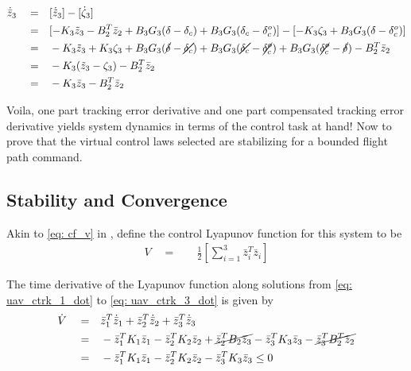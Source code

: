 \documentclass[12pt]{ucthesis}
\begin{document}
\begin{fleqn} 
\begin{align} \label{eq: uav_ctrk_3_dot}
\dot{\bar{z}}_3 \quad =& \quad [\dot{\tilde{z}}_3] - [\dot{\zeta}_3] \nonumber \\
				\quad =& \quad [-K_3 \tilde{z}_3 - B^T_2 \bar{z}_2 + B_3 G_3 (\delta - \delta_c) + B_3 G_3 (\delta_c - \delta^o_c)] - [-K_3 \zeta_3 + B_3 G_3(\delta - \delta^o_{c})] \nonumber \\
				\quad =& \quad -K_3 \tilde{z}_3 + K_3 \zeta_3 + B_3 G_3 (\cancel{\delta} - \cancel{\delta_c}) + B_3 G_3 (\cancel{\delta_c} - \cancel{\delta^o_c}) + B_3 G_3(\cancel{\delta^o_{c}} - \cancel{\delta}) -B^T_2 \bar{z}_2 \nonumber \\
				\quad =& \quad -K_3 (\tilde{z}_3 - \zeta_3) - B^T_2 \bar{z}_2 \nonumber \\
				\quad =& \quad -K_3 \bar{z}_3 - B^T_2 \bar{z}_2
\end{align}
\end{fleqn}

Voila, one part tracking error derivative and one part compensated tracking error derivative yields system dynamics in terms of the control task at hand! Now to prove that the virtual control laws selected are stabilizing for a bounded flight path command.

\subsection{Stability and Convergence}
\label{subsec: uav_lyapunov_app}
%
Akin to \autoref{eq: cf_v} in , define the control Lyapunov function for this system to be
\begin{align} \label{eq: uav_v}
V \quad =& \quad \frac{1}{2}\left[ \sum\limits_{i=1}^{3} \bar{z}^T_i \bar{z}_i \right]
\end{align}

The time derivative of the Lyapunov function along solutions from \autoref{eq: uav_ctrk_1_dot} to \ref{eq: uav_ctrk_3_dot} is given by
\begin{align} \label{eq: uav_vdot}
\dot{V} \quad =& \quad \bar{z}^T_1 \dot{\bar{z}}_1 + \bar{z}^T_2 \dot{\bar{z}}_2 + \bar{z}^T_3 \dot{\bar{z}}_3 \nonumber \\
		\quad =& \quad -\bar{z}^T_1 K_1 \bar{z}_1  - \bar{z}^T_2 K_2 \bar{z}_2   + \cancel{\bar{z}^T_2 B_2 \bar{z}_3} - \bar{z}^T_3 K_3 \bar{z}_3 - \cancel{\bar{z}^T_3 B^T_2 \bar{z}_2} \nonumber \\
		\quad =& \quad -\bar{z}^T_1 K_1 \bar{z}_1  - \bar{z}^T_2 K_2 \bar{z}_2  - \bar{z}^T_3 K_3 \bar{z}_3	\leq 0
\end{align}
\end{document}
